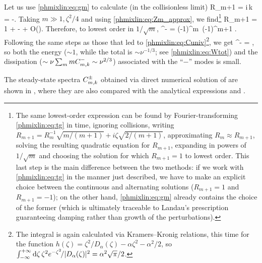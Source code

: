 Let us use \eqref{phmixlin:eq:gm} to calculate (in the collisionless limit) 
\beq
R_{m+1} \equiv {} = 
i\,\sgn k\, 
= -.
\label{phmixlin:eq:Rm_exact}
\eeq
Taking $m\gg1, \zeta^2/4$ and using \eqref{phmixlin:eq:Zm_approx}, we find\footnote{The same 
lowest-order expression can be found by Fourier-transforming 
\eqref{phmixlin:eq:tg} in time, ignoring collisions, 
writing $R_{m+1} = R_m^{-1}\sqrt{m/(m+1)} + i\zeta\sqrt{2/(m+1)}$, 
approximating $R_m\approx R_{m+1}$, solving the resulting quadratic equation for $R_{m+1}$,  
expanding in powers of $1/\sqrt{m}$ and choosing the solution for which $R_{m+1}=1$ 
to lowest order. This last step is the main difference between the two methods: 
if we work with \eqref{phmixlin:eq:tg} in the manner just described, we have to make an explicit 
choice between the continuous and alternating solutions ($R_{m+1}=1$ and $R_{m+1}=-1$); 
on the other hand, \eqref{phmixlin:eq:gm} already contains the choice of the former (which is ultimately 
traceable to Landau's prescription guaranteeing damping rather than growth of the perturbations).}
\beq
R_{m+1} = 1 +  -  + O\lt(\rt).
\label{phmixlin:eq:Rm_approx}
\eeq
Therefore, to lowest order in $1/\sqrt{m}$, 
\beq
\tgmko^- = (-1)^m\tgmko\, 
\approx(-1)^{m+1}\,\,\tgmko. 
\eeq
Following the same steps as those that led to \eqref{phmixlin:eq:Cuniv}\footnote{The integral is 
again calculated via Kramers--Kronig relations, this time for the function 
$h(\zeta) = \zeta^2/D_\alpha(\zeta) - \alpha \zeta^2 - \alpha^2/2$, 
so $\int_{-\infty}^{+\infty}{\rm d}\zeta\,\zeta^2 e^{-\zeta^2}\!/|D_\alpha(\zeta)|^2
= \alpha^2\sqrt{\pi}/2$.}, 
we get
\beq
\Cmk^- \approx {} 
 =  , 
\label{phmixlin:eq:Cminus}
\eeq
so both the energy ($\sim 1$, while the total is $\sim\nu^{-1/3}$; see \eqref{phmixlin:eq:Wtot})
and the dissipation ($\sim\nu\sum_m mC_{m,k}^-\sim \nu^{2/3}$) associated with the 
``$-$'' modes is small.  

The steady-state spectra $C_{m,k}^\pm$ obtained via direct numerical solution 
of  are shown in , where they are also 
compared with the analytical expressions  and .  

